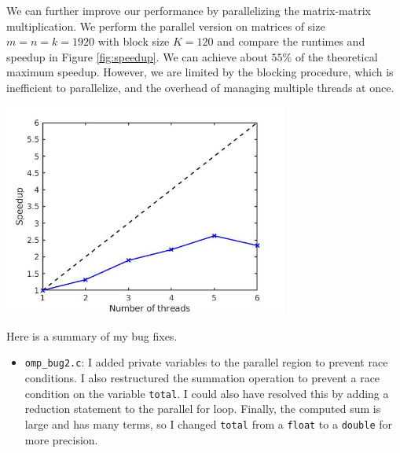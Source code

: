 \begin{questions}
\begin{solution}
    We can further improve our performance by parallelizing the matrix-matrix multiplication.
    We perform the parallel version on matrices of size $m=n=k=1920$ with block
    size $K=120$ and compare the runtimes and speedup in Figure \ref{fig:speedup}. We
    can achieve about $55\%$ of the theoretical maximum speedup. However, we are limited
    by the blocking procedure, which is inefficient to parallelize, and the overhead of
    managing multiple threads at once.
    
    \begin{center}
        \includegraphics[width=0.7\textwidth]{Images/Matmat_efficiency.jpg}
        \label{fig:speedup}
    \end{center}
    
    
\end{solution}










\begin{solution}
    Here is a summary of my bug fixes.
    \begin{itemize}
        \item \texttt{omp\_bug2.c}: I added private variables to the parallel
        region to prevent race conditions. I also restructured the summation 
        operation to prevent a race condition on the variable \texttt{total}.
        I could also have resolved this by adding a reduction statement to 
        the parallel for loop. Finally, the computed sum is large and has many
        terms, so I changed  \texttt{total} from a  \texttt{float} to a 
         \texttt{double} for more precision.
         

\end{itemize}
\end{solution}
\end{questions}
